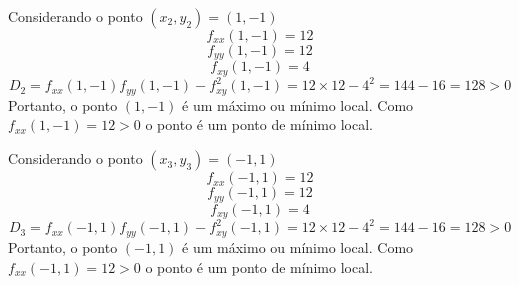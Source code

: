 \documentclass[a4paper,12pt,fleqn]{article}
\begin{document}
\begin{answer}
  Considerando o ponto \((x_2, y_2) = (1, -1)\)
  \[
    f_{xx}(1, -1) = 12
  \]
  \[
    f_{yy}(1, -1) = 12
  \]
  \[
    f_{xy}(1, -1) = 4
  \]
  \[
    D_2
    = f_{xx}(1, -1)f_{yy}(1, -1) - f^2_{xy}(1, -1)
    = 12 \times 12 - 4^2
    = 144 -16
    = 128 > 0
  \]
  Portanto, o ponto $(1, -1)$ é um máximo ou mínimo local. Como \(f_{xx}(1, -1) = 12 > 0\)
  o ponto é um ponto de mínimo local.

  Considerando o ponto \((x_3, y_3) = (-1, 1)\)
  \[
    f_{xx}(-1, 1) = 12
  \]
  \[
    f_{yy}(-1, 1) = 12
  \]
  \[
    f_{xy}(-1, 1) = 4
  \]
  \[
    D_3
    = f_{xx}(-1, 1)f_{yy}(-1, 1) - f^2_{xy}(-1, 1)
    = 12 \times 12 - 4^2
    = 144 -16
    = 128 > 0
  \]
  Portanto, o ponto $(-1, 1)$ é um máximo ou mínimo local. Como \(f_{xx}(-1, 1) = 12 > 0\)
  o ponto é um ponto de mínimo local.
\end{answer}

\end{document}
